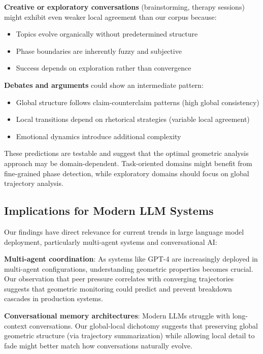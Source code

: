 \documentclass[11pt,letterpaper]{article}
\begin{document}
\textbf{Creative or exploratory conversations} (brainstorming, therapy sessions) might exhibit even weaker local agreement than our corpus because:
\begin{itemize}
\item Topics evolve organically without predetermined structure
\item Phase boundaries are inherently fuzzy and subjective
\item Success depends on exploration rather than convergence
\end{itemize}

\textbf{Debates and arguments} could show an intermediate pattern:
\begin{itemize}
\item Global structure follows claim-counterclaim patterns (high global consistency)
\item Local transitions depend on rhetorical strategies (variable local agreement)
\item Emotional dynamics introduce additional complexity
\end{itemize}

These predictions are testable and suggest that the optimal geometric analysis approach may be domain-dependent. Task-oriented domains might benefit from fine-grained phase detection, while exploratory domains should focus on global trajectory analysis.

\subsection{Implications for Modern LLM Systems}

Our findings have direct relevance for current trends in large language model deployment, particularly multi-agent systems and conversational AI:

\textbf{Multi-agent coordination}: As systems like GPT-4 are increasingly deployed in multi-agent configurations, understanding geometric properties becomes crucial. Our observation that peer pressure correlates with converging trajectories suggests that geometric monitoring could predict and prevent breakdown cascades in production systems.

\textbf{Conversational memory architectures}: Modern LLMs struggle with long-context conversations. Our global-local dichotomy suggests that preserving global geometric structure (via trajectory summarization) while allowing local detail to fade might better match how conversations naturally evolve.
\end{document}
